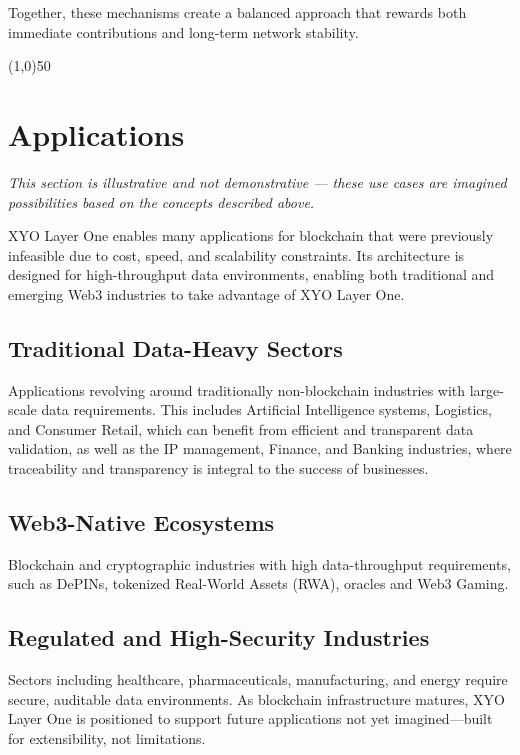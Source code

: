 \documentclass{article}
\begin{document}
Together, these mechanisms create a balanced approach that rewards both
immediate contributions and long-term network stability.

\begin{center}
\line(1,0){50}
\end{center}

\section{Applications}
\textit{This section is illustrative and not demonstrative — these use cases are imagined possibilities based on the concepts described above.}

XYO Layer One enables many applications for blockchain that were previously infeasible due to cost, speed, and scalability constraints. Its architecture is designed for high-throughput data environments, enabling both traditional and emerging Web3 industries to take advantage of XYO Layer One.

\subsection{Traditional Data-Heavy Sectors}
Applications revolving around traditionally non-blockchain industries with large-scale data requirements. This includes Artificial Intelligence systems, Logistics, and Consumer Retail, which can benefit from efficient and transparent data validation, as well as the IP management, Finance, and Banking industries, where traceability and transparency is integral to the success of businesses.

\subsection{Web3-Native Ecosystems}
Blockchain and cryptographic industries with high data-throughput requirements, such as DePINs, tokenized Real-World Assets (RWA), oracles and Web3 Gaming.

\subsection{Regulated and High-Security Industries}
Sectors including healthcare, pharmaceuticals, manufacturing, and energy require secure, auditable data environments.
As blockchain infrastructure matures, XYO Layer One is positioned to support future applications not yet imagined—built for extensibility, not limitations.
\end{document}
